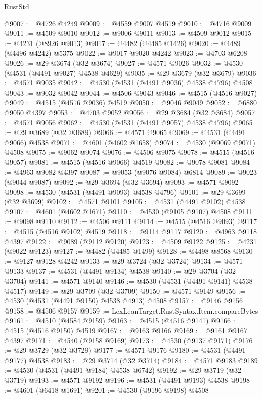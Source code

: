 \begin{lexlean}{RustStd}
\begin{coremodule}
@9007 := @4726 @4249
@9009 := @4559 @9007 @4519
@9010 := @4716 @9009
@9011 := @4509 @9010
@9012 := @9006 @9011
@9013 := @4509 @9012
@9015 := @4231 (@8926 @9013)
@9017 := @4482 (@4485 @1426)
@9020 := @4489 (@4496 @4242) @5375
@9022 := @9017 @9020 @4242
@9023 := @4703 @6208
@9026 := @29 @3674 (@32 @3674)
@9027 := @4571 @9026
@9032 := @4530 (@4531 (@4491 @9027) @4538 @4629)
@9035 := @29 @3679 (@32 @3679)
@9036 := @4571 @9035
@9042 := @4530 (@4531 (@4491 @9036) @4538 @4796) @4508
@9043 := @9032 @9042
@9044 := @4506 @9043
@9046 := @4515 (@4516 @9027)
@9049 := @4515 (@4516 @9036) @4519
@9050 := @9046 @9049
@9052 := @6880 @9050 @4397
@9053 := @4703 @9052
@9056 := @29 @3684 (@32 @3684)
@9057 := @4571 @9056
@9062 := @4530 (@4531 (@4491 @9057) @4538 @4796)
@9065 := @29 @3689 (@32 @3689)
@9066 := @4571 @9065
@9069 := @4531 (@4491 @9066) @4538
@9071 := @4601 (@4602 @1658)
@9074 := @4530 (@9069 @9071) @4508
@9075 := @9062 @9074
@9076 := @4506 @9075
@9078 := @4515 (@4516 @9057)
@9081 := @4515 (@4516 @9066) @4519
@9082 := @9078 @9081
@9084 := @4963 @9082 @4397
@9087 := @9053 (@9076 @9084) @6814
@9089 := @9023 (@9044 @9087)
@9092 := @29 @3694 (@32 @3694)
@9093 := @4571 @9092
@9098 := @4530 (@4531 (@4491 @9093) @4538 @4796)
@9101 := @29 @3699 (@32 @3699)
@9102 := @4571 @9101
@9105 := @4531 (@4491 @9102) @4538
@9107 := @4601 (@4602 @1671)
@9110 := @4530 (@9105 @9107) @4508
@9111 := @9098 @9110
@9112 := @4506 @9111
@9114 := @4515 (@4516 @9093)
@9117 := @4515 (@4516 @9102) @4519
@9118 := @9114 @9117
@9120 := @4963 @9118 @4397
@9122 := @9089 (@9112 @9120)
@9123 := @4509 @9122
@9125 := @4231 (@9022 @9123)
@9127 := @4482 (@4485 @1499)
@9128 := @4498 @8568
@9130 := @9127 @9128 @4242
@9133 := @29 @3724 (@32 @3724)
@9134 := @4571 @9133
@9137 := @4531 (@4491 @9134) @4538
@9140 := @29 @3704 (@32 @3704)
@9141 := @4571 @9140
@9146 := @4530 (@4531 (@4491 @9141) @4538 @4517)
@9149 := @29 @3709 (@32 @3709)
@9150 := @4571 @9149
@9156 := @4530 (@4531 (@4491 @9150) @4538 @4913) @4508
@9157 := @9146 @9156
@9158 := @4506 @9157
@9159 := LexLeanTarget.RustSyntax.Item.compareBytes
@9161 := @4510 (@4584 @9159)
@9163 := @4515 (@4516 @9141)
@9166 := @4515 (@4516 @9150) @4519
@9167 := @9163 @9166
@9169 := @9161 @9167 @4397
@9171 := @4540 (@9158 @9169)
@9173 := @4530 (@9137 @9171)
@9176 := @29 @3729 (@32 @3729)
@9177 := @4571 @9176
@9180 := @4531 (@4491 @9177) @4538
@9183 := @29 @3714 (@32 @3714)
@9184 := @4571 @9183
@9189 := @4530 (@4531 (@4491 @9184) @4538 @6742)
@9192 := @29 @3719 (@32 @3719)
@9193 := @4571 @9192
@9196 := @4531 (@4491 @9193) @4538
@9198 := @4601 (@6418 @1691)
@9201 := @4530 (@9196 @9198) @4508

\end{coremodule}
\end{lexlean}
